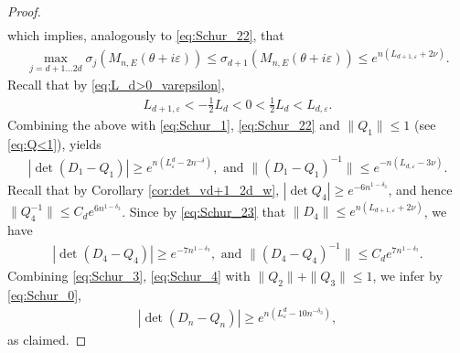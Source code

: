 \documentclass[11pt]{amsart}
\begin{document}
\begin{proof}
\begin{align}
\end{align}
which implies, analogously to \eqref{eq:Schur_22}, that
\begin{align}\label{eq:Schur_23}
\max_{j=d+1\ldots 2d}\sigma_j(M_{n,E}(\theta+i\varepsilon))\leq \sigma_{d+1}(M_{n,E}(\theta+i\varepsilon))\leq e^{n(L_{d+1,\varepsilon}+2\nu)}.
\end{align}
Recall that by \eqref{eq:L_d>0_varepsilon}, 
\begin{align}
    L_{d+1,\varepsilon}<-\frac{1}{2}L_d<0<\frac{1}{2}L_d<L_{d,\varepsilon}.
\end{align}
Combining the above with \eqref{eq:Schur_1}, \eqref{eq:Schur_22} and  $\|Q_1\|\leq 1$ (see \eqref{eq:Q<1}), yields
\begin{align}\label{eq:Schur_3}
    |\det (D_1-Q_1)|\geq e^{n(L^d_{\varepsilon}-2n^{-\delta})}, \text{ and } \|(D_1-Q_1)^{-1}\|\leq e^{-n(L_{d,\varepsilon}-3\nu)}.
\end{align}
Recall that by Corollary \ref{cor:det_vd+1_2d_w}, $|\det Q_4|\geq e^{-6n^{1-\delta_3}}$, and hence $\|Q_4^{-1}\|\leq C_d e^{6n^{1-\delta_3}}$. Since by \eqref{eq:Schur_23} that $\|D_4\|\leq e^{n(L_{d+1,\varepsilon}+2\nu)}$, we have
\begin{align}\label{eq:Schur_4}
    |\det (D_4-Q_4)|\geq e^{-7n^{1-\delta_3}}, \text{ and } \|(D_4-Q_4)^{-1}\|\leq C_d e^{7n^{1-\delta_3}}.
\end{align}
Combining \eqref{eq:Schur_3}, \eqref{eq:Schur_4} with  $\|Q_2\|+\|Q_3\|\leq 1$, we infer by \eqref{eq:Schur_0},
\begin{align}
    |\det(D_n-Q_n)|\geq e^{n(L^d_{\varepsilon}-10 n^{-\delta_3})},
\end{align}
as claimed.
\end{proof}
\end{document}
